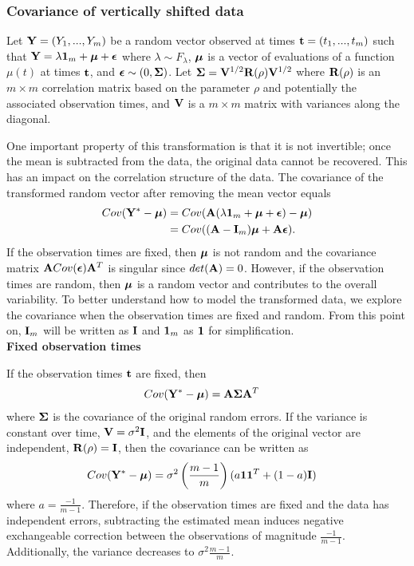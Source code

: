 \subsubsection{Covariance of vertically shifted data}
Let $\mathbf Y=(Y_{1},...,Y_{m})$ be a random vector observed at times $\mathbf t=(t_{1},...,t_{m})$ such that
$\mathbf Y = \lambda\mathbf 1_{m} + \boldsymbol\mu + \boldsymbol\epsilon$
where $\lambda\sim F_{\lambda}$, $\boldsymbol\mu$ is a vector of evaluations of a function $\mu(t)$ at times $\mathbf t$, and $\boldsymbol\epsilon\sim(0,\boldsymbol\Sigma)$. Let $\mathbf\Sigma =\mathbf V^{1/2}\mathbf R(\rho)\mathbf V^{1/2}$ where $\mathbf R(\rho)$ is an $m\times m$ correlation matrix based on the parameter $\rho$ and potentially the associated observation times, and $\mathbf V$ is a $m\times m$ matrix with variances along the diagonal. 

 One important property of this transformation is that it is not invertible; once the mean is subtracted from the data, the original data cannot be recovered. This has an impact on the correlation structure of the data. The covariance of the transformed random vector after removing the mean vector equals
\begin{align*}
Cov(\mathbf Y^{*} - \boldsymbol\mu) &= Cov(\mathbf A(\lambda\mathbf 1_{m} + \boldsymbol\mu + \boldsymbol\epsilon) - \boldsymbol\mu)\\
&= Cov((\mathbf A-\mathbf I_{m})\boldsymbol\mu + \mathbf A \boldsymbol\epsilon).
\end{align*}
If the observation times are fixed, then $\boldsymbol \mu$ is not random and the covariance matrix $\mathbf A Cov(\boldsymbol\epsilon)\mathbf A^{T}$ is singular since $det(\mathbf A) =0$. However, if the observation times are random, then $\boldsymbol \mu$ is a random vector and contributes to the overall variability. To better understand how to model the transformed data, we explore the covariance when the observation times are fixed and random. From this point on, $\mathbf I_{m}$ will be written as $\mathbf I$ and $\mathbf 1_{m}$ as $\mathbf 1$ for simplification.\\

\noindent \textbf{Fixed observation times}

If the observation times $\mathbf t$ are fixed, then
\begin{align*}
Cov(\mathbf Y^{*} - \boldsymbol\mu) &= \mathbf A\boldsymbol\Sigma \mathbf A^{T}
\end{align*}
where $\boldsymbol\Sigma$ is the covariance of the original random errors. If the variance is constant over time, $\mathbf V=\sigma^{2}\mathbf I$, and the elements of the original vector are independent, $\mathbf R(\rho)=\mathbf I$, then the covariance can be written as
\begin{align*} 
Cov(\mathbf Y^{*}- \boldsymbol\mu) &=\sigma^{2}\left(\frac{m-1}{m}\right)(a\mathbf 1\mathbf 1^{T}+ (1-a)\mathbf I)
\end{align*}
 where $a=\frac{-1}{m-1}$. Therefore, if the observation times are fixed and the data has independent errors, subtracting the estimated mean induces negative exchangeable correction between the observations of magnitude $\frac{-1}{m-1}$. Additionally, the variance decreases to $\sigma^{2}\frac{m-1}{m}$.
 
